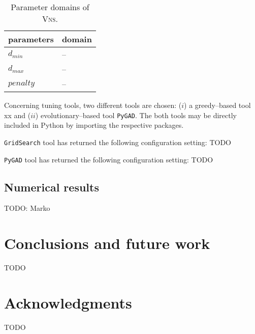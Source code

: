 \documentclass[sigconf]{acmart}
\begin{document}
    \begin{table}[ht]
   	\begin{tabular}{ll}
   		parameters      & domain \\ \hline
   	$d_{min}$ &  -- \\
   	$d_{max}$ &  -- \\
   	 $penalty$ & --  \\   \hline
   	\end{tabular}
   	\caption{Parameter domains of \textsc{Vns}.}  
   	   	\label{tab:domain_tuning}
   \end{table}
   
   Concerning tuning tools, two different tools are chosen: ($i$) a greedy--based tool xx and ($ii$) evolutionary--based tool \texttt{PyGAD}. The both tools may be directly included in Python by importing the respective packages.
   
    \texttt{GridSearch} tool has returned the following configuration setting: TODO
    
     \texttt{PyGAD} tool has returned the following configuration setting: TODO
\subsection{Numerical results }
 TODO: Marko
\section{Conclusions and future work}
 TODO
 
\section*{Acknowledgments} 
TODO



 
\end{document}
